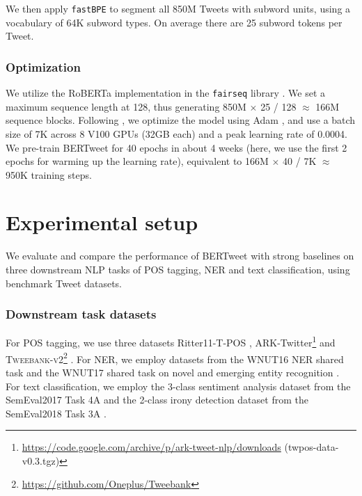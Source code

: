 \documentclass[11pt,a4paper]{article}
\begin{document}
We then apply \texttt{fastBPE} \citep{sennrich-etal-2016-neural} to segment all 850M Tweets with subword units, using a vocabulary of 64K subword types. On average there are 25 subword tokens per Tweet. 





\subsubsection*{Optimization}
We utilize the RoBERTa implementation in the \texttt{fairseq} library \citep{ott2019fairseq}. We set a maximum sequence length at  128, thus generating  850M $\times$ 25 / 128 $\approx$ 166M sequence blocks. Following , we optimize the model using Adam \citep{KingmaB14}, and use a batch size of 7K across 8 V100 GPUs (32GB each) and a peak learning rate of 0.0004. We pre-train BERTweet for 40 epochs   in  about {4} weeks (here, we use the first 2 epochs for warming up the learning rate), equivalent to 166M $\times$ 40 / 7K $\approx$ 950K training steps.




\section{Experimental setup}

We evaluate and compare the performance of BERTweet with strong baselines on three downstream NLP tasks of POS tagging, NER and text classification, using benchmark Tweet datasets. 
 

\subsubsection*{Downstream task datasets} 
For POS tagging, we use three datasets Ritter11-T-POS \cite{ritter-etal-2011-named}, ARK-Twitter\footnote{\url{https://code.google.com/archive/p/ark-tweet-nlp/downloads} (twpos-data-v0.3.tgz) } 
\citep{gimpel-etal-2011-part,owoputi-etal-2013-improved} and \textsc{Tweebank-v2}\footnote{\url{https://github.com/Oneplus/Tweebank}} 
\citep{liu-etal-2018-parsing}. For NER, we employ datasets from the WNUT16 NER shared task 
\citep{strauss-etal-2016-results} and the WNUT17 shared task 
on novel and emerging entity recognition \citep{derczynski-etal-2017-results}. For text classification, we employ the 3-class sentiment analysis dataset from the SemEval2017 Task 4A 
\citep{rosenthal-etal-2017-semeval} and the 2-class irony detection dataset from the SemEval2018 Task 3A 
\citep{van-hee-etal-2018-semeval}.
\end{document}
